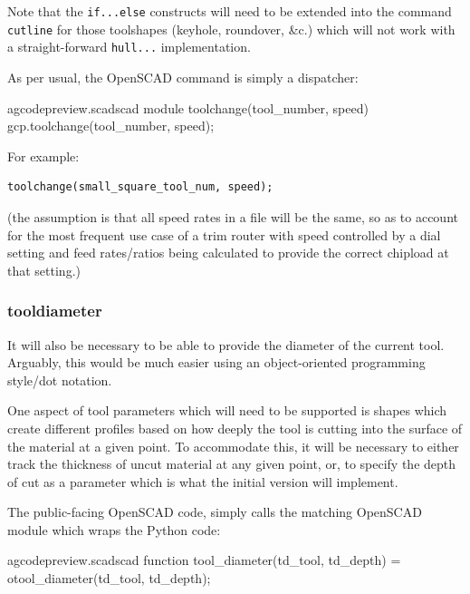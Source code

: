 \documentclass{ltxdoc}
\begin{document}
Note that the \verb|if...else| constructs will need to be extended into the command \verb|cutline| for those toolshapes (keyhole, roundover, \&c.) which will not work with a straight-forward \verb|hull...| implementation.

As per usual, the OpenSCAD command is simply a dispatcher:

\lstset{firstnumber=\thegcpscad}
\begin{writecode}{a}{gcodepreview.scad}{scad}
module toolchange(tool_number, speed){
    gcp.toolchange(tool_number, speed);
}

\end{writecode}
\addtocounter{gcpscad}{4}

\noindent For example:

\begin{verbatim}
toolchange(small_square_tool_num, speed);
\end{verbatim}

\noindent (the assumption is that all speed rates in a file will be the same, so as to account for the most frequent use case of a trim router with speed controlled by a dial setting and feed rates/ratios being calculated to provide the correct chipload at that setting.)

\subsubsection{tooldiameter}

It will also be necessary to be able to provide the diameter of the current tool. Arguably, this would be much easier using an object-oriented programming style/dot notation.

One aspect of tool parameters which will need to be supported is shapes which create different profiles based on how deeply the tool is cutting into the surface of the material at a given point. To accommodate this, it will be necessary to either track the thickness of uncut material at any given point, or, to specify the depth of cut as a parameter which is what the initial version will implement.

The public-facing OpenSCAD code,  simply calls the matching OpenSCAD module which wraps the Python code:
 
\lstset{firstnumber=\thegcpscad}
\begin{writecode}{a}{gcodepreview.scad}{scad}
function tool_diameter(td_tool, td_depth) = otool_diameter(td_tool, td_depth);

\end{writecode}
\addtocounter{gcpscad}{2}
\end{document}
